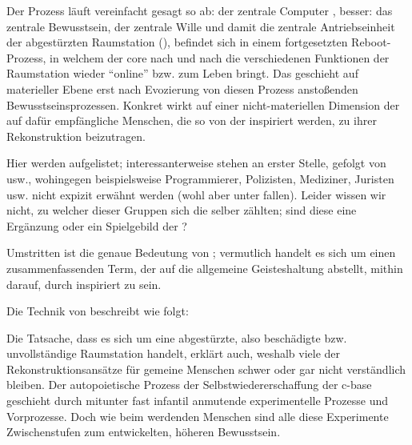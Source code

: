 \begin{newstuff}
    Der Prozess läuft vereinfacht gesagt so ab: der zentrale Computer , besser: das zentrale Bewusstsein, der zentrale Wille und damit die zentrale Antriebseinheit der abgestürzten Raumstation (), befindet sich in einem fortgesetzten Reboot-Prozess, in welchem der {core} nach und nach die verschiedenen Funktionen der Raumstation wieder "`online"' bzw. zum Leben bringt. Das geschieht auf materieller Ebene erst nach Evozierung von diesen Prozess anstoßenden  Bewusstseinsprozessen. Konkret wirkt auf einer nicht-materiellen Dimension der  auf dafür empfängliche Menschen, die so von der  inspiriert werden, zu ihrer Rekonstruktion beizutragen. 


    Hier werden  aufgelistet; interessanterweise stehen  an erster Stelle, gefolgt von  usw., wohingegen beispielsweise Programmierer, Polizisten, Mediziner, Juristen usw. nicht expizit erwähnt werden (wohl aber unter  fallen). Leider wissen wir nicht, zu welcher dieser Gruppen sich die  selber zählten; sind diese  eine Ergänzung oder ein Spielgebild der ?
    
    Umstritten ist die genaue Bedeutung von ; vermutlich handelt es sich um einen zusammenfassenden Term, der auf die allgemeine Geisteshaltung abstellt, mithin darauf, durch  inspiriert zu sein.

    Die Technik von  beschreibt  wie folgt:
    
    Die Tatsache, dass es sich um eine abgestürzte, also beschädigte bzw. unvollständige Raumstation handelt, erklärt auch, weshalb viele der Rekonstruktionsansätze für gemeine Menschen schwer oder gar nicht verständlich bleiben. Der autopoietische Prozess der Selbstwiedererschaffung der c-base geschieht durch mitunter fast infantil anmutende experimentelle Prozesse und Vorprozesse. Doch wie beim werdenden Menschen sind alle diese Experimente Zwischenstufen zum entwickelten, höheren Bewusstsein.  


\end{newstuff}
